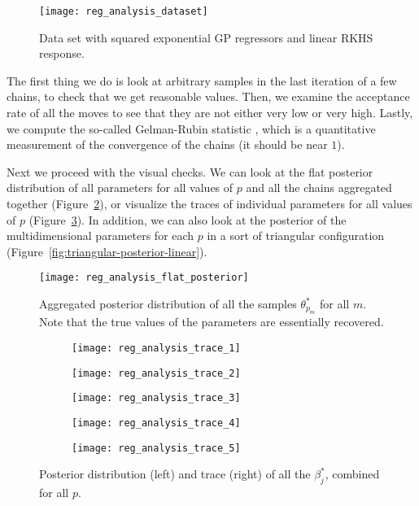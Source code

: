 \begin{figure}[ht!]
  \centering
  \texttt{[image: reg\_analysis\_dataset]}
  \caption{Data set with squared exponential GP regressors and linear RKHS response.}\label{fig:dataset-linear}
\end{figure}

The first thing we do is look at arbitrary samples in the last iteration of a few chains, to check that we get reasonable values. Then, we examine the acceptance rate of all the moves to see that they are not either very low or very high. Lastly, we compute the so-called Gelman-Rubin statistic \citep{gelman1992inference}, which is a quantitative measurement of the convergence of the chains (it should be near \(1\)).

Next we proceed with the visual checks. We can look at the flat posterior distribution of all parameters for all values of \(p\) and all the chains aggregated together (Figure~\ref{fig:flat-posterior-linear}), or visualize the traces of individual parameters for all values of \(p\) (Figure~\ref{fig:trace-plot}). In addition, we can also look at the posterior of the multidimensional parameters for each \(p\) in a sort of triangular configuration (Figure~\ref{fig:triangular-posterior-linear}).

\begin{figure}[ht!]
  \centering
  \texttt{[image: reg\_analysis\_flat\_posterior]}
  \caption{Aggregated posterior distribution of all the samples \(\theta^*_{p_m}\) for all \(m\). Note that the true values of the parameters are essentially recovered.}\label{fig:flat-posterior-linear}
\end{figure}

\begin{figure}[ht!]
  \centering
  \begin{subfigure}[b]{.65\textwidth}
    \centering
    \texttt{[image: reg\_analysis\_trace\_1]}
  \end{subfigure}
  \begin{subfigure}[b]{.65\textwidth}
    \centering
    \texttt{[image: reg\_analysis\_trace\_2]}
  \end{subfigure}
  \begin{subfigure}[b]{.65\textwidth}
      \centering
      \texttt{[image: reg\_analysis\_trace\_3]}
  \end{subfigure}
  \begin{subfigure}[b]{.65\textwidth}
      \centering
      \texttt{[image: reg\_analysis\_trace\_4]}
  \end{subfigure}
  \begin{subfigure}[b]{.65\textwidth}
      \centering
      \texttt{[image: reg\_analysis\_trace\_5]}
  \end{subfigure}
  \caption{Posterior distribution (left) and trace (right) of all the \(\beta_j^*\), combined for all \(p\).}\label{fig:trace-plot}
\end{figure}

